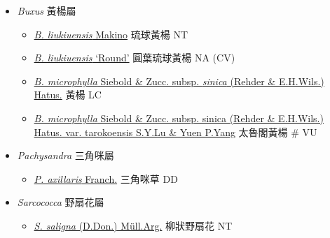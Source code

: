 
  \begin{itemize}
 \item[] \textit{Buxus} 黃楊屬
                                
  \begin{itemize}
        \item[] \href{http://www.theplantlist.org/tpl1.1/search?q=Buxus+liukiuensis}{\textit{B. liukiuensis} Makino}   琉球黃楊   NT
        \item[] \href{http://www.theplantlist.org/tpl1.1/search?q=Buxus+liukiuensis}{\textit{B. liukiuensis} ‘Round’}   圓葉琉球黃楊   NA (CV)
        \item[] \href{http://www.theplantlist.org/tpl1.1/search?q=Buxus+microphylla+subsp.+sinica}{\textit{B. microphylla} Siebold \& Zucc. subsp. \textit{sinica} (Rehder \& E.H.Wils.) Hatus.}   黃楊   LC
        \item[] \href{http://www.theplantlist.org/tpl1.1/search?q=Buxus+microphylla+subsp.+sinica+var.+tarokoensis}{\textit{B. microphylla} Siebold \& Zucc. subsp. sinica (Rehder \& E.H.Wils.) Hatus. var. tarokoensis S.Y.Lu \& Yuen P.Yang}   太魯閣黃楊  \# VU
  \end{itemize}
 \item[] \textit{Pachysandra} 三角咪屬
                                
  \begin{itemize}
        \item[] \href{http://www.theplantlist.org/tpl1.1/search?q=Pachysandra+axillaris}{\textit{P. axillaris} Franch.}   三角咪草   DD
  \end{itemize}
 \item[] \textit{Sarcococca} 野扇花屬
                                
  \begin{itemize}
        \item[] \href{http://www.theplantlist.org/tpl1.1/search?q=Sarcococca+saligna}{\textit{S. saligna} (D.Don.) Müll.Arg.}   柳狀野扇花   NT
  \end{itemize}
  \end{itemize}
